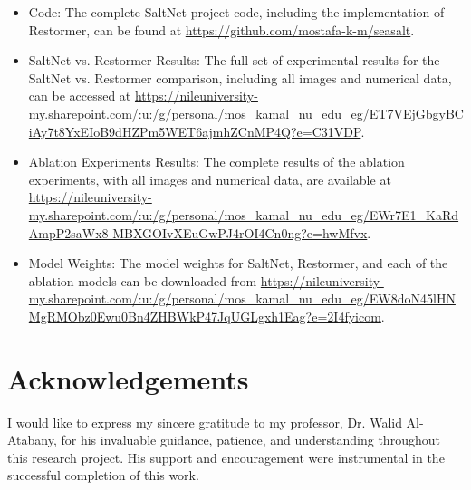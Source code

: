 \documentclass{article}
\begin{document}
\begin{itemize}
\item Code: The complete SaltNet project code, including the implementation of Restormer, can be found at \url{https://github.com/mostafa-k-m/seasalt}.
\item SaltNet vs. Restormer Results: The full set of experimental results for the SaltNet vs. Restormer comparison, including all images and numerical data, can be accessed at \url{https://nileuniversity-my.sharepoint.com/:u:/g/personal/mos_kamal_nu_edu_eg/ET7VEjGbgyBCiAy7t8YxEIoB9dHZPm5WET6ajmhZCnMP4Q?e=C31VDP}.
\item Ablation Experiments Results: The complete results of the ablation experiments, with all images and numerical data, are available at \url{https://nileuniversity-my.sharepoint.com/:u:/g/personal/mos_kamal_nu_edu_eg/EWr7E1_KaRdAmpP2saWx8-MBXGOIvXEuGwPJ4rOI4Cn0ng?e=hwMfvx}.
\item Model Weights: The model weights for SaltNet, Restormer, and each of the ablation models can be downloaded from \url{https://nileuniversity-my.sharepoint.com/:u:/g/personal/mos_kamal_nu_edu_eg/EW8doN45lHNMgRMObz0Ewu0Bn4ZHBWkP47JqUGLgxh1Eag?e=2I4fyicom}.
\end{itemize}

\section*{Acknowledgements}
\label{sec:acknowledgements}
I would like to express my sincere gratitude to my professor, Dr. Walid Al-Atabany, for his invaluable guidance, patience, and understanding throughout this research project. His support and encouragement were instrumental in the successful completion of this work.

\label{sec:references}

\end{document}
